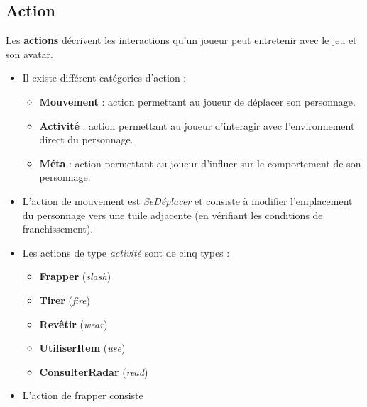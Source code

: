 \subsection{Action}
Les \textbf{actions} décrivent les interactions qu'un joueur peut entretenir avec le jeu et son avatar.
\begin{itemize}
    \item Il existe différent catégories d'action :
    \begin{itemize}
        \item \textbf{Mouvement} : action permettant au joueur de déplacer son personnage.
        \item \textbf{Activité} : action permettant au joueur d'interagir avec l'environnement direct du personnage.
        \item \textbf{Méta} : action permettant au joueur d'influer sur le comportement de son personnage.
    \end{itemize}
    \item L'action de mouvement est \textit{SeDéplacer} et consiste à modifier l'emplacement du personnage vers une tuile adjacente (en vérifiant les conditions de franchissement).
    \item Les actions de type \textit{activité} sont de cinq types :
    \begin{itemize}
        \item \textbf{Frapper} (\textit{slash})
        \item \textbf{Tirer} (\textit{fire})
        \item \textbf{Revêtir} (\textit{wear})
        \item \textbf{UtiliserItem} (\textit{use})
        \item \textbf{ConsulterRadar} (\textit{read})
    \end{itemize}
    \item L'action de frapper consiste 
\end{itemize}

